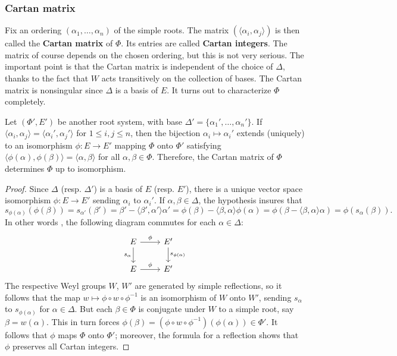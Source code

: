 \subsubsection{Cartan matrix}
Fix an ordering $(\alpha_1,\dots,\alpha_n)$ of the simple roots. The matrix $(\langle\alpha_i,\alpha_j\rangle)$ is then called the \textbf{Cartan matrix} of $\Phi$. Its entries are called \textbf{Cartan integers}. The matrix of course depends on the chosen ordering, but this is not very serious. The important point is that the Cartan matrix is independent of the choice of $\Delta$, thanks to the fact that $W$ acts transitively on the collection of bases. The Cartan matrix is nonsingular since $\Delta$ is a basis of $E$. It turns out to characterize $\Phi$ completely.
\begin{proposition}\label{root system determined by Cartan matrix}
Let $(\Phi',E')$ be another root system, with base $\Delta'=\{\alpha_1',\dots,\alpha_n'\}$. If $\langle\alpha_i,\alpha_j\rangle=\langle\alpha_i',\alpha_j'\rangle$ for $1\leq i,j\leq n$, then the bijection $\alpha_i\mapsto\alpha_i'$ extends (uniquely) to an isomorphism $\phi:E\to E'$ mapping $\Phi$ onto $\Phi'$ satisfying $\langle\phi(\alpha),\phi(\beta)\rangle=\langle\alpha,\beta\rangle$ for all $\alpha,\beta\in\Phi$. Therefore, the Cartan matrix of $\Phi$ determines $\Phi$ up to isomorphism.
\end{proposition}
\begin{proof}
Since $\Delta$ (resp. $\Delta'$) is a basis of $E$ (resp. $E'$), there is a unique vector space isomorphism $\phi:E\to E'$ sending $\alpha_i$ to $\alpha_i'$. If $\alpha,\beta\in\Delta$, the hypothesis insures that
\[s_{\phi(\alpha)}(\phi(\beta))=s_{\alpha'}(\beta')=\beta'-\langle\beta',\alpha'\rangle\alpha'=\phi(\beta)-\langle\beta,\alpha\rangle\phi(\alpha)=\phi(\beta-\langle\beta,\alpha\rangle\alpha)=\phi(s_\alpha(\beta)).\]
In other words , the following diagram commutes for each $\alpha\in\Delta$:
\[\begin{tikzcd}
E\ar[r,"\phi"]\ar[d,swap,"s_\alpha"]&E'\ar[d,"s_{\phi(\alpha)}"]\\
E\ar[r,"\phi"]&E'
\end{tikzcd}\]
The respective Weyl groups $W$, $W'$ are generated by simple reflections, so it follows that the map $w\mapsto\phi\circ w\circ\phi^{-1}$ is an isomorphism of $W$ onto $W'$, sending $s_\alpha$ to $s_{\phi(\alpha)}$ for $\alpha\in\Delta$. But each $\beta\in\Phi$ is conjugate under $W$ to a simple root, say $\beta=w(\alpha)$. This in turn forces $\phi(\beta)=(\phi\circ w\circ\phi^{-1})(\phi(\alpha))\in\Phi'$. It follows that $\phi$ maps $\Phi$ onto $\Phi'$; moreover, the formula for a reflection shows that $\phi$ preserves all Cartan integers.
\end{proof}
